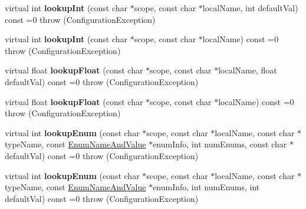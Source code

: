 \begin{DoxyCompactItemize}
\item 
\hypertarget{classCONFIG4CPP__NAMESPACE_1_1Configuration_af8e8ace7fe8ba60b580dc7575fb8218f}{virtual int {\bfseries lookup\-Int} (const char $\ast$scope, const char $\ast$local\-Name, int default\-Val) const =0  throw (\-Configuration\-Exception)}\label{classCONFIG4CPP__NAMESPACE_1_1Configuration_af8e8ace7fe8ba60b580dc7575fb8218f}

\item 
\hypertarget{classCONFIG4CPP__NAMESPACE_1_1Configuration_a5be802f9ec20e88ecc6e0312fdfb1fb5}{virtual int {\bfseries lookup\-Int} (const char $\ast$scope, const char $\ast$local\-Name) const =0  throw (\-Configuration\-Exception)}\label{classCONFIG4CPP__NAMESPACE_1_1Configuration_a5be802f9ec20e88ecc6e0312fdfb1fb5}

\item 
\hypertarget{classCONFIG4CPP__NAMESPACE_1_1Configuration_aa95a3d368ba9cc6e9504c7d7e76b0a86}{virtual float {\bfseries lookup\-Float} (const char $\ast$scope, const char $\ast$local\-Name, float default\-Val) const =0  throw (\-Configuration\-Exception)}\label{classCONFIG4CPP__NAMESPACE_1_1Configuration_aa95a3d368ba9cc6e9504c7d7e76b0a86}

\item 
\hypertarget{classCONFIG4CPP__NAMESPACE_1_1Configuration_a9abd2d9569ce735829e20456d663938c}{virtual float {\bfseries lookup\-Float} (const char $\ast$scope, const char $\ast$local\-Name) const =0  throw (\-Configuration\-Exception)}\label{classCONFIG4CPP__NAMESPACE_1_1Configuration_a9abd2d9569ce735829e20456d663938c}

\item 
\hypertarget{classCONFIG4CPP__NAMESPACE_1_1Configuration_a2ae8691ea64b67ba84d21e9512f44b24}{virtual int {\bfseries lookup\-Enum} (const char $\ast$scope, const char $\ast$local\-Name, const char $\ast$type\-Name, const \hyperlink{structCONFIG4CPP__NAMESPACE_1_1EnumNameAndValue}{Enum\-Name\-And\-Value} $\ast$enum\-Info, int num\-Enums, const char $\ast$default\-Val) const =0  throw (\-Configuration\-Exception)}\label{classCONFIG4CPP__NAMESPACE_1_1Configuration_a2ae8691ea64b67ba84d21e9512f44b24}

\item 
\hypertarget{classCONFIG4CPP__NAMESPACE_1_1Configuration_adfed2a57303fdb4c8e7191832890f750}{virtual int {\bfseries lookup\-Enum} (const char $\ast$scope, const char $\ast$local\-Name, const char $\ast$type\-Name, const \hyperlink{structCONFIG4CPP__NAMESPACE_1_1EnumNameAndValue}{Enum\-Name\-And\-Value} $\ast$enum\-Info, int num\-Enums, int default\-Val) const =0  throw (\-Configuration\-Exception)}\label{classCONFIG4CPP__NAMESPACE_1_1Configuration_adfed2a57303fdb4c8e7191832890f750}


\end{DoxyCompactItemize}
